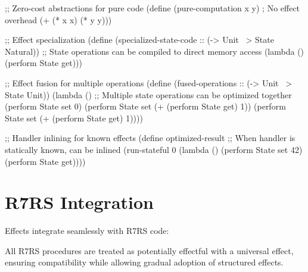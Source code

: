 \begin{example}
\begin{lambdustcode}
;; Zero-cost abstractions for pure code
(define (pure-computation x y)   ; No effect overhead
  (+ (* x x) (* y y)))

;; Effect specialization  
(define (specialized-state-code :: (-> Unit ~> {State} Natural))
  ;; State operations can be compiled to direct memory access
  (lambda ()
    (perform State get)))

;; Effect fusion for multiple operations
(define (fused-operations :: (-> Unit ~> {State} Unit))
  (lambda ()
    ;; Multiple state operations can be optimized together
    (perform State set 0)
    (perform State set (+ (perform State get) 1))
    (perform State set (+ (perform State get) 1))))

;; Handler inlining for known effects
(define optimized-result
  ;; When handler is statically known, can be inlined
  (run-stateful 0 
    (lambda () 
      (perform State set 42)
      (perform State get))))
\end{lambdustcode}
\end{example}

\section{R7RS Integration}
\label{sec:effects-r7rs}


Effects integrate seamlessly with R7RS code:

\begin{compatibility}
All R7RS procedures are treated as potentially effectful with a universal  effect, ensuring compatibility while allowing gradual adoption of structured effects.
\end{compatibility}

